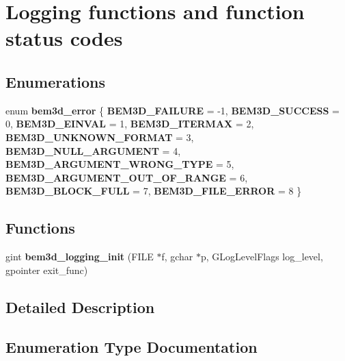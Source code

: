 \section{Logging functions and function status codes}
\label{group__logging}
\subsection*{Enumerations}
\begin{DoxyCompactItemize}
\item 
enum \textbf{ bem3d\+\_\+error} \{ \newline
{\bfseries B\+E\+M3\+D\+\_\+\+F\+A\+I\+L\+U\+RE} = -\/1, 
{\bfseries B\+E\+M3\+D\+\_\+\+S\+U\+C\+C\+E\+SS} = 0, 
{\bfseries B\+E\+M3\+D\+\_\+\+E\+I\+N\+V\+AL} = 1, 
{\bfseries B\+E\+M3\+D\+\_\+\+I\+T\+E\+R\+M\+AX} = 2, 
\newline
{\bfseries B\+E\+M3\+D\+\_\+\+U\+N\+K\+N\+O\+W\+N\+\_\+\+F\+O\+R\+M\+AT} = 3, 
{\bfseries B\+E\+M3\+D\+\_\+\+N\+U\+L\+L\+\_\+\+A\+R\+G\+U\+M\+E\+NT} = 4, 
{\bfseries B\+E\+M3\+D\+\_\+\+A\+R\+G\+U\+M\+E\+N\+T\+\_\+\+W\+R\+O\+N\+G\+\_\+\+T\+Y\+PE} = 5, 
{\bfseries B\+E\+M3\+D\+\_\+\+A\+R\+G\+U\+M\+E\+N\+T\+\_\+\+O\+U\+T\+\_\+\+O\+F\+\_\+\+R\+A\+N\+GE} = 6, 
\newline
{\bfseries B\+E\+M3\+D\+\_\+\+B\+L\+O\+C\+K\+\_\+\+F\+U\+LL} = 7, 
{\bfseries B\+E\+M3\+D\+\_\+\+F\+I\+L\+E\+\_\+\+E\+R\+R\+OR} = 8
 \}
\end{DoxyCompactItemize}
\subsection*{Functions}
\begin{DoxyCompactItemize}
\item 
gint \textbf{ bem3d\+\_\+logging\+\_\+init} (F\+I\+LE $\ast$f, gchar $\ast$p, G\+Log\+Level\+Flags log\+\_\+level, gpointer exit\+\_\+func)
\end{DoxyCompactItemize}


\subsection{Detailed Description}


\subsection{Enumeration Type Documentation}
\mbox{\label{group__logging_gafedd6c0ca9ef1a73e3d6faf645feaaea}} 
